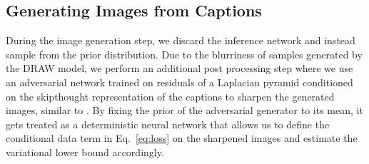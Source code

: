 \documentclass{article} %
\newcommand{\Eqref}[1]{Eq.~\ref{#1}} %
\newcommand{\comm}[1]{}
\newcommand{\henc}{h^{infer}}
\newcommand{\Lat}{Z}
\newcommand{\post}{Q}
\newcommand{\prior}{P}
\newcommand{\loss}{\mathcal{L}}
\begin{document}
\comm{
\begin{align}
\loss &= -\sum_{t=1}^{T}D_{KL}(\post(\Lat_t|\henc_t,s_{t-1})\,||\,\prior(\Lat_t)) + \frac{1}{L}\sum_{l=1}^{L}log\,p(x_{t}|y,z)\\
&=
\frac{1}{2}\sum_{t=1}^{T}(1 - 2\,log\,\sigma_{t}^{prior} + 2\,log\,\sigma_{t} - \frac{\exp(2\,log\,\sigma_{t}) + (\mu_{t} - \mu_{t}^{prior})^{2}}{\exp(2\,log\,\sigma_{t}^{prior})}) + \frac{1}{L}\sum_{l=1}^{L}log\,p(x_{t}|y,z)
\end{align}
}

\subsection{Generating Images from Captions}
\vspace{-0.05in}
During the image generation step, 
we discard the inference network and instead sample from the prior distribution. 
Due to the blurriness of samples generated by the DRAW model, we perform an additional post processing step where we use an 
adversarial network trained on residuals of a Laplacian pyramid conditioned on the skipthought representation \citep{kiros_skipthought} of the captions 
to sharpen the generated images, similar to \citep{denton_lapgan}. By fixing the prior of the adversarial generator to its mean, it gets treated as a deterministic neural network that allows us to define the conditional data term in \Eqref{eq:loss} on the sharpened images and 
estimate the variational lower bound accordingly. 
\end{document}

